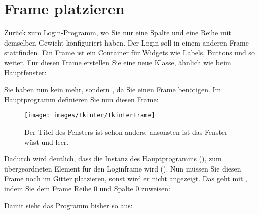
\section{Frame platzieren}

Zurück zum Login-Programm, wo Sie nur eine Spalte und eine Reihe mit demselben Gewicht konfiguriert haben. Der Login soll in einem anderen Frame stattfinden. Ein Frame ist ein Container für Widgets wie Labels, Buttons und so weiter. Für diesen Frame erstellen Sie eine neue Klasse, ähnlich wie beim Hauptfenster:

\medskip



\PYTHON{}



\medskip


Sie haben nun kein  mehr, sondern , da Sie einen Frame benötigen. Im Hauptprogramm definieren Sie nun diesen Frame:

\medskip


\medskip


\begin{figure}
    \texttt{[image: images/Tkinter/TkinterFrame]}
    \caption{Der Titel des Fensters ist schon anders, ansonsten ist das Fenster wüst und leer.} \label{TkinterFrame}
\end{figure}


Dadurch wird deutlich, dass die Instanz des Hauptprogramms (), zum übergeordneten Element für den Loginframe wird (). Nun müssen Sie diesen Frame noch im Gitter platzieren, sonst wird er nicht angezeigt. Das geht mit , indem Sie dem Frame Reihe 0 und Spalte 0 zuweisen:


\medskip


\medskip

Damit sieht das Programm bisher so aus:

\begin{code}
     
     
     
     
     
    \caption{Tkinter Class mit Frame}\label{TkinterFrame}
\end{code}   


